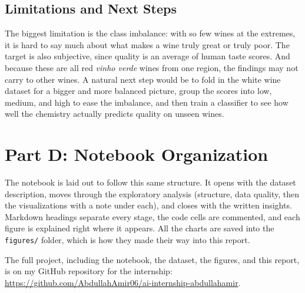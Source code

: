 \documentclass[11pt,a4paper]{article}
\begin{document}
\subsection*{Limitations and Next Steps}
The biggest limitation is the class imbalance: with so few wines at the extremes,
it is hard to say much about what makes a wine truly great or truly poor. The
target is also subjective, since quality is an average of human taste scores. And
because these are all red \emph{vinho verde} wines from one region, the findings
may not carry to other wines. A natural next step would be to fold in the white
wine dataset for a bigger and more balanced picture, group the scores into low,
medium, and high to ease the imbalance, and then train a classifier to see how
well the chemistry actually predicts quality on unseen wines.

\section*{Part D: Notebook Organization}
The notebook is laid out to follow this same structure. It opens with the
dataset description, moves through the exploratory analysis (structure, data
quality, then the visualizations with a note under each), and closes with the
written insights. Markdown headings separate every stage, the code cells are
commented, and each figure is explained right where it appears. All the charts
are saved into the \texttt{figures/} folder, which is how they made their way
into this report.

The full project, including the notebook, the dataset, the figures, and this
report, is on my GitHub repository for the internship:
\url{https://github.com/AbdullahAmir06/ai-internship-abdullahamir}.

\end{document}
